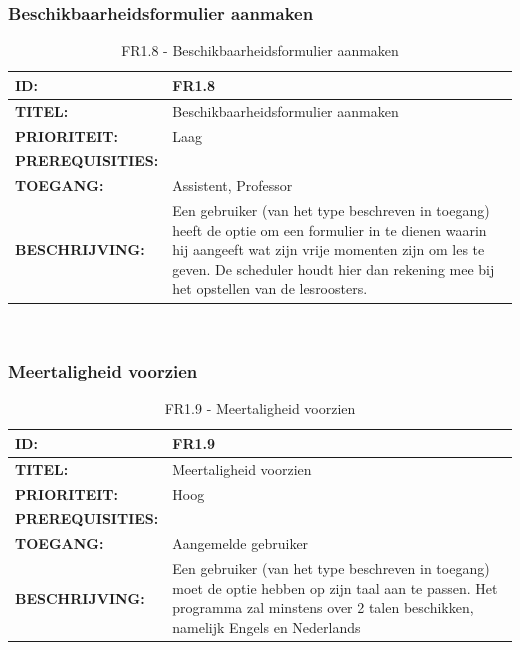 
\subsubsection{Beschikbaarheidsformulier aanmaken}  
\noindent\begin{table}[H]
            \begin{tabular}{l | p{10cm}}
                \textbf{ID:} & FR1.8 \\ \hline
                \textbf{TITEL:} & Beschikbaarheidsformulier aanmaken\\ \hline
                \textbf{PRIORITEIT:} &  Laag \\ \hline
                \textbf{PREREQUISITIES:} & \\ \hline
                \textbf{TOEGANG:} & Assistent, Professor \\ \hline
                \textbf{BESCHRIJVING:} & Een gebruiker (van het type beschreven in toegang) heeft de optie om een formulier in te dienen waarin hij aangeeft wat zijn vrije momenten zijn om les te geven. De scheduler houdt hier dan rekening mee bij het opstellen van de lesroosters.\\ 
            \end{tabular}\\
            \caption{FR1.8 - Beschikbaarheidsformulier aanmaken}
            \label{tab:FR1.8 - Beschikbaarheidsformulier aanmaken}
        \end{table}
        
\subsubsection{Meertaligheid voorzien}  
\noindent\begin{table}[H]
            \begin{tabular}{l | p{10cm}}
                \textbf{ID:} & FR1.9 \\ \hline
                \textbf{TITEL:} & Meertaligheid voorzien\\ \hline
                \textbf{PRIORITEIT:} &  Hoog \\ \hline
                \textbf{PREREQUISITIES:} & \\ \hline
                \textbf{TOEGANG:} & Aangemelde gebruiker \\ \hline
                \textbf{BESCHRIJVING:} & Een gebruiker (van het type beschreven in toegang) moet de optie hebben op zijn taal aan te passen. Het programma zal minstens over 2 talen beschikken, namelijk Engels en Nederlands\\ 
            \end{tabular}\\
            \caption{FR1.9 - Meertaligheid voorzien}
            \label{tab:FR1.9 - Meertaligheid voorzien}
        \end{table}
        

